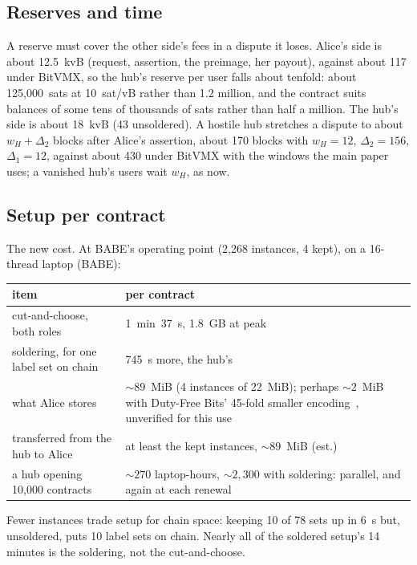 \documentclass[11pt]{article}
\begin{document}
\subsection{Reserves and time}

A reserve must cover the other side's fees in a dispute it loses. Alice's
side is about 12.5~kvB (request, assertion, the preimage, her payout),
against about 117 under BitVMX, so the hub's reserve per user falls
about tenfold: about 125,000~sats at 10~sat/vB rather than 1.2 million,
and the contract suits balances of some tens of thousands of sats
rather than half a million. The hub's side is about 18~kvB (43
unsoldered). A hostile hub stretches a dispute to about
$w_H + \Delta_2$ blocks after Alice's assertion, about 170 blocks with
$w_H = 12$, $\Delta_2 = 156$, $\Delta_1 = 12$, against about 430 under
BitVMX with the windows the main paper uses; a vanished hub's users wait
$w_H$, as now.

\subsection{Setup per contract}
\label{sec:setup}

The new cost. At BABE's operating point (2,268 instances, 4 kept), on a
16-thread laptop (BABE):
\begin{center}
\small
\begin{tabularx}{\linewidth}{>{\raggedright\arraybackslash}p{60mm}L}
\toprule
item & per contract \\
\midrule
cut-and-choose, both roles & 1~min~37~s, 1.8~GB at peak \\
soldering, for one label set on chain & 745~s more, the hub's \\
what Alice stores & ${\sim}89$~MiB (4 instances of 22~MiB); perhaps ${\sim}2$~MiB with Duty-Free Bits' 45-fold smaller encoding~\cite{dutyfree}, unverified for this use \\
transferred from the hub to Alice & at least the kept instances, ${\sim}89$~MiB (est.) \\
a hub opening 10,000 contracts & ${\sim}270$ laptop-hours, ${\sim}2{,}300$ with soldering: parallel, and again at each renewal \\
\bottomrule
\end{tabularx}
\end{center}
Fewer instances trade setup for chain space: keeping 10 of 78 sets up in
6~s but, unsoldered, puts 10 label sets on chain. Nearly all of the
soldered setup's 14 minutes is the soldering, not the cut-and-choose.
\end{document}
